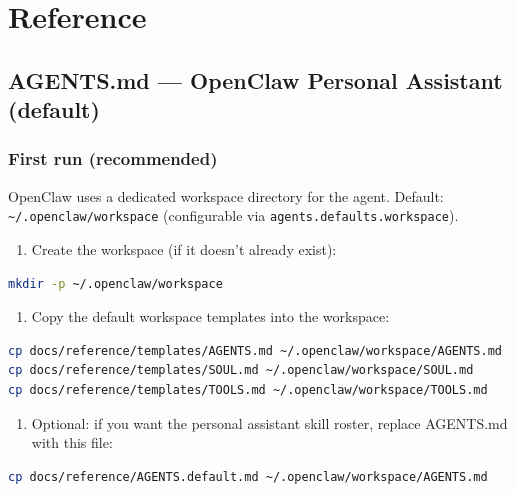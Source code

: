 \chapter{Reference}

\section{AGENTS.md — OpenClaw Personal Assistant (default)}


\subsection{First run (recommended)}


OpenClaw uses a dedicated workspace directory for the agent. Default: \texttt{\textasciitilde{}/.openclaw/workspace} (configurable via \texttt{agents.defaults.workspace}).

\begin{enumerate}
  \item Create the workspace (if it doesn’t already exist):
\end{enumerate}


\begin{lstlisting}[language=bash]
mkdir -p ~/.openclaw/workspace
\end{lstlisting}


\begin{enumerate}
  \item Copy the default workspace templates into the workspace:
\end{enumerate}


\begin{lstlisting}[language=bash]
cp docs/reference/templates/AGENTS.md ~/.openclaw/workspace/AGENTS.md
cp docs/reference/templates/SOUL.md ~/.openclaw/workspace/SOUL.md
cp docs/reference/templates/TOOLS.md ~/.openclaw/workspace/TOOLS.md
\end{lstlisting}


\begin{enumerate}
  \item Optional: if you want the personal assistant skill roster, replace AGENTS.md with this file:
\end{enumerate}


\begin{lstlisting}[language=bash]
cp docs/reference/AGENTS.default.md ~/.openclaw/workspace/AGENTS.md
\end{lstlisting}


